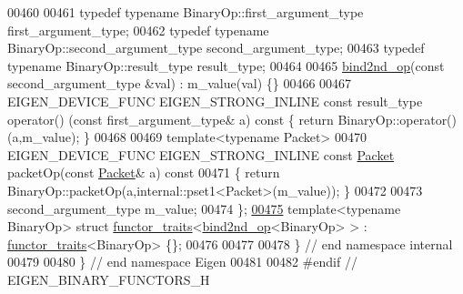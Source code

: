 \begin{DoxyCode}
00460 
00461   \textcolor{keyword}{typedef} \textcolor{keyword}{typename} BinaryOp::first\_argument\_type  first\_argument\_type;
00462   \textcolor{keyword}{typedef} \textcolor{keyword}{typename} BinaryOp::second\_argument\_type second\_argument\_type;
00463   \textcolor{keyword}{typedef} \textcolor{keyword}{typename} BinaryOp::result\_type          result\_type;
00464 
00465   \hyperlink{struct_eigen_1_1internal_1_1bind2nd__op}{bind2nd\_op}(\textcolor{keyword}{const} second\_argument\_type &val) : m\_value(val) \{\}
00466 
00467   EIGEN\_DEVICE\_FUNC EIGEN\_STRONG\_INLINE \textcolor{keyword}{const} result\_type operator() (\textcolor{keyword}{const} first\_argument\_type& a)\textcolor{keyword}{ const }\{
       \textcolor{keywordflow}{return} BinaryOp::operator()(a,m\_value); \}
00468 
00469   \textcolor{keyword}{template}<\textcolor{keyword}{typename} Packet>
00470   EIGEN\_DEVICE\_FUNC EIGEN\_STRONG\_INLINE \textcolor{keyword}{const} \hyperlink{union_eigen_1_1internal_1_1_packet}{Packet} packetOp(\textcolor{keyword}{const} \hyperlink{union_eigen_1_1internal_1_1_packet}{Packet}& a)\textcolor{keyword}{ const}
00471 \textcolor{keyword}{  }\{ \textcolor{keywordflow}{return} BinaryOp::packetOp(a,internal::pset1<Packet>(m\_value)); \}
00472 
00473   second\_argument\_type m\_value;
00474 \};
\hyperlink{struct_eigen_1_1internal_1_1functor__traits_3_01bind2nd__op_3_01_binary_op_01_4_01_4}{00475} \textcolor{keyword}{template}<\textcolor{keyword}{typename} BinaryOp> \textcolor{keyword}{struct }\hyperlink{struct_eigen_1_1internal_1_1functor__traits}{functor\_traits}<\hyperlink{struct_eigen_1_1internal_1_1bind2nd__op}{bind2nd\_op}<BinaryOp> > : 
      \hyperlink{struct_eigen_1_1internal_1_1functor__traits}{functor\_traits}<BinaryOp> \{\};
00476 
00477 
00478 \} \textcolor{comment}{// end namespace internal}
00479 
00480 \} \textcolor{comment}{// end namespace Eigen}
00481 
00482 \textcolor{preprocessor}{#endif // EIGEN\_BINARY\_FUNCTORS\_H}
\end{DoxyCode}
